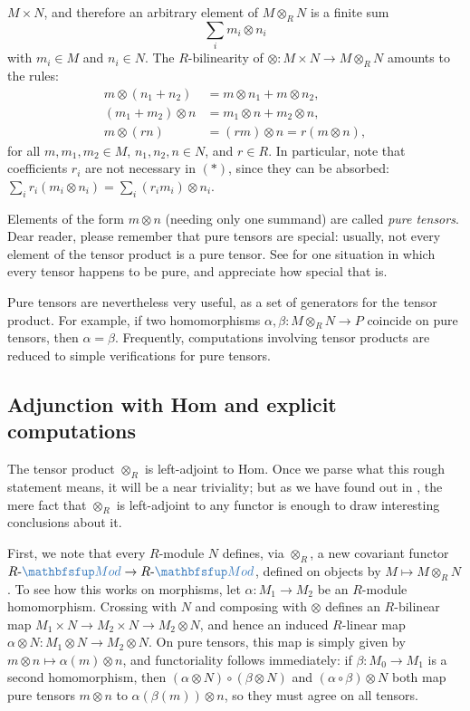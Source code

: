 $M \times N$, and therefore an arbitrary element of $M \otimes_R N$ is
a finite sum
\[
  \tag{$*$} \sum_i m_i \otimes n_i
\]
with $m_i \in M$ and $n_i \in N$. The $R$-bilinearity of
$\otimes : M \times N \to M \otimes_R N$ amounts to the rules:
\begin{align*}
  m \otimes (n_1 + n_2) &= m \otimes n_1 + m \otimes n_2, \\
  (m_1 + m_2) \otimes n &= m_1 \otimes n + m_2 \otimes n, \\
  m \otimes (rn) &= (rm) \otimes n = r(m \otimes n),
\end{align*}
for all $m, m_1, m_2 \in M$, $n_1, n_2, n \in N$, and $r \in R$. In
particular, note that coefficients $r_i$ are not necessary in $(*)$,
since they can be absorbed:
$\sum_i r_i(m_i \otimes n_i) = \sum_i (r_i m_i) \otimes n_i$.

Elements of the form $m \otimes n$ (needing only one summand) are
called \emph{pure tensors}. Dear reader, please remember that pure
tensors are special: usually, not every element of the tensor product
is a pure tensor. See  for
one situation in which every tensor happens to be pure, and appreciate
how special that is.

Pure tensors are nevertheless very useful, as a set of generators for
the tensor product. For example, if two homomorphisms
$\alpha, \beta : M \otimes_R N \to P$ coincide on pure tensors, then
$\alpha = \beta$. Frequently, computations involving tensor products
are reduced to simple verifications for pure tensors.

\subsection{Adjunction with Hom and explicit computations}%
\label{subsec:linrep:adjunction-with-hom-and-explicit-computations}

The tensor product $\otimes_R$ is left-adjoint to Hom. Once we parse
what this rough statement means, it will be a near triviality; but as
we have found out in , the
mere fact that $\otimes_R$ is left-adjoint to any functor is enough to
draw interesting conclusions about it.

First, we note that every $R$-module $N$ defines, via $\otimes_R$, a
new covariant functor $R\text{-}\categ{Mod} \to R\text{-}\categ{Mod}$,
defined on objects by $M \mapsto M \otimes_R N$. To see how this works
on morphisms, let $\alpha : M_1 \to M_2$ be an $R$-module
homomorphism.  Crossing with $N$ and composing with $\otimes$ defines
an $R$-bilinear map $M_1 \times N \to M_2 \times N \to M_2 \otimes N$,
and hence an induced $R$-linear map
$\alpha \otimes N : M_1 \otimes N \to M_2 \otimes N$. On pure tensors,
this map is simply given by $m \otimes n \mapsto \alpha(m) \otimes n$,
and functoriality follows immediately: if $\beta : M_0 \to M_1$ is a
second homomorphism, then $(\alpha \otimes N) \circ (\beta \otimes N)$
and $(\alpha \circ \beta) \otimes N$ both map pure tensors
$m \otimes n$ to $\alpha(\beta(m)) \otimes n$, so they must agree on
all tensors.


